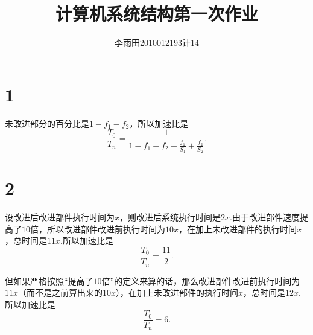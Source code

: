 \documentclass[adobefonts, nocap]{ctexart}
\begin{document}
  \title{计算机系统结构第一次作业}
  \author{李雨田\hspace{1em}2010012193\hspace{1em}计14}
  \maketitle
  \section*{1}
    未改进部分的百分比是$1-f_{1}-f_{2}$，所以加速比是
    \[
      \frac{T_{0}}{T_{n}}=\frac{1}{1-f_{1}-f_{2}+\frac{f_{1}}{S_{1}}+\frac{f_{2}}{S_{2}}}.
    \]
  \section*{2}
    设改进后改进部件执行时间为$x$，则改进后系统执行时间是$2x$.由于改进部件速度提高了$10$倍，所以改进部件改进前执行时间为$10x$，在加上未改进部件的执行时间$x$，总时间是$11x$.所以加速比是
    \[
      \frac{T_{0}}{T_{n}}=\frac{11}{2}.
    \]

    但如果严格按照“提高了$10$倍”的定义来算的话，那么改进部件改进前执行时间为$11x$（而不是之前算出来的$10x$），在加上未改进部件的执行时间$x$，总时间是$12x$.所以加速比是
    \[
      \frac{T_{0}}{T_{n}}=6.
    \]
\end{document}
